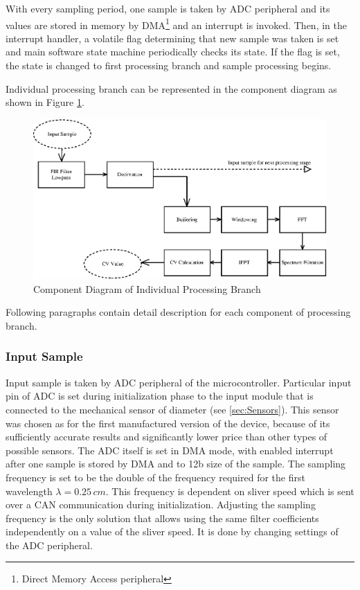 \documentclass[twoside]{ctuthesis}
\theoremstyle{plain}
\theoremstyle{definition}
\theoremstyle{note}
\begin{document}
With every sampling period, one sample is taken by ADC peripheral and its values are stored in memory by DMA\footnote{Direct Memory Access peripheral} and an interrupt is invoked. Then, in the interrupt handler, a volatile flag determining that new sample was taken is set and main software state machine periodically checks its state. If the flag is set, the state is changed to first processing branch and sample processing begins.

Individual processing branch can be represented in the component diagram as shown in Figure \ref{fig:singleBranch}.

\begin{figure}[h]
	\centering
	\includegraphics[width=1.0\textwidth]{sliver_singleBranch.eps}
	\caption{Component Diagram of Individual Processing Branch}
	\label{fig:singleBranch}
\end{figure}

Following paragraphs contain detail description for each component of processing branch.

\subsubsection{Input Sample}
Input sample is taken by ADC peripheral of the microcontroller. Particular input pin of ADC is set during initialization phase to the input module that is connected to the mechanical sensor of diameter (see \ref{sec:Sensors}). This sensor was chosen as for the first manufactured version of the device, because of its sufficiently accurate results and significantly lower price than other types of possible sensors. The ADC itself is set in DMA mode, with enabled interrupt after one sample is stored by DMA and to 12b size of the sample.
The sampling frequency is set to be the double of the frequency required for the first wavelength $\lambda=0.25\,cm$. This frequency is dependent on sliver speed which is sent over a CAN communication during initialization. Adjusting the sampling frequency is the only solution that allows using the same filter coefficients independently on a value of the sliver speed. It is done by changing settings of the ADC peripheral.
\end{document}

